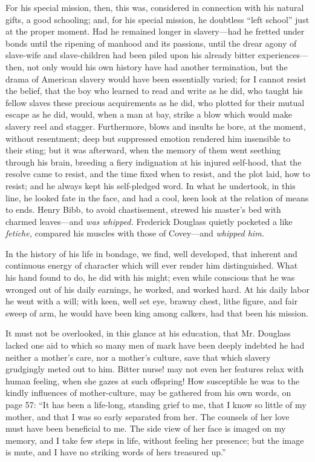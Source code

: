 For his special mission, then, this was, considered in connection with
his natural gifts, a good schooling; and, for his special mission, he
doubtless ``left school'' just at the proper moment. Had he remained
longer in slavery---had he fretted under bonds until the ripening of
manhood and its passions, until the drear agony of slave-wife and
slave-children had been piled upon his already bitter
experiences---then, not only would his own history have had another
termination, but the drama of American slavery would have been
essentially varied; for I cannot resist the belief, that the boy who
learned to read and write as he did, who taught his fellow slaves these
precious acquirements as he did, who plotted for their mutual escape as
he did, would, when a man at bay, strike a blow which would make slavery
reel and stagger. Furthermore, blows and insults he bore, at the moment,
without resentment; deep but suppressed emotion rendered him insensible
to their sting; but it was afterward, when the memory of them went
seething through his brain, breeding a fiery indignation at his injured
self-hood, that the resolve came to resist, and the time fixed when to
resist, and {\protect\hypertarget{xx}{}{}}the plot laid, how to resist;
and he always kept his self-pledged word. In what he undertook, in this
line, he looked fate in the face, and had a cool, keen look at the
relation of means to ends. Henry Bibb, to avoid chastisement, strewed
his master's bed with charmed leaves---and \emph{was whipped.} Frederick
Douglass quietly pocketed a like \emph{fetiche,} compared his muscles
with those of Covey---and \emph{whipped him.}

In the history of his life in bondage, we find, well developed, that
inherent and continuous energy of character which will ever render him
distinguished. What his hand found to do, he did with his might; even
while conscious that he was wronged out of his daily earnings, he
worked, and worked hard. At his daily labor he went with a will; with
keen, well set eye, brawny chest, lithe figure, and fair sweep of arm,
he would have been king among calkers, had that been his mission.

It must not be overlooked, in this glance at his education, that Mr.
Douglass lacked one aid to which so many men of mark have been deeply
indebted he had neither a mother's care, nor a mother's culture, save
that which slavery grudgingly meted out to him. Bitter nurse! may not
even her features relax with human feeling, when she gazes at such
offspring! How susceptible he was to the kindly influences of
mother-culture, may be gathered from his own words, on page 57: ``It has
been a life-long, standing grief to me, that I know so little of my
mother, and that I was so early separated from her. The counsels of her
love must have been beneficial to me. The side view of her face is
imaged on my memory, and I take few steps in life, without feeling her
presence; but the image is mute, and I have no striking words of hers
treasured up.''

